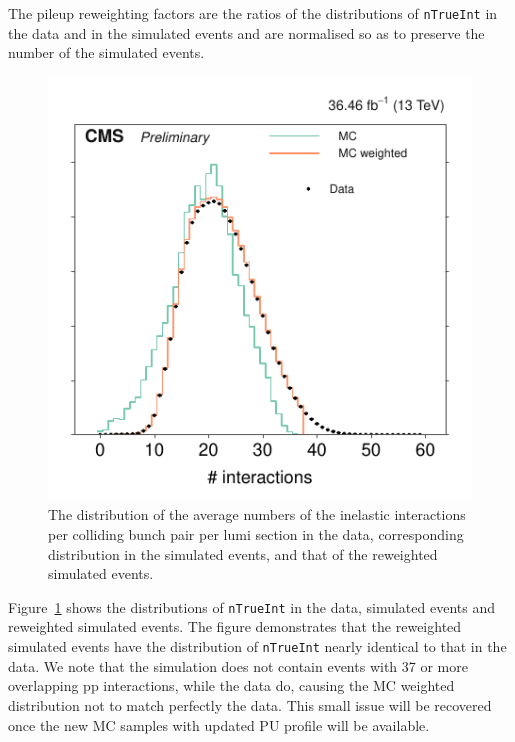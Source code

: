 The pileup reweighting factors are the ratios of the distributions of
\verb!nTrueInt! in the data and in the simulated events and are
normalised so as to preserve the number of the simulated events.

\begin{figure}[!b]
  \centering
  \includegraphics[scale=1.00]{figures/pileup_reweighting/f044_corr_nTrueInt_data_mc_norm}
  \caption{The distribution of the average numbers of the inelastic
    interactions per colliding bunch pair per lumi section in the data,
    corresponding distribution in the simulated events, and that of the
    reweighted simulated events.} \label{f044_corr_nTrueInt_data_mc_norm}
\end{figure}


Figure~\ref{f044_corr_nTrueInt_data_mc_norm} shows the distributions
of \verb!nTrueInt! in the data, simulated events and reweighted
simulated events. The figure demonstrates that the reweighted
simulated events have the distribution of \verb!nTrueInt! nearly
identical to that in the data. 
We note that the simulation does not contain events with 37 or more
overlapping pp interactions, while the data do, causing the MC
weighted distribution not to match perfectly the data. This small
issue will be recovered once the new MC samples with updated PU
profile will be available.



